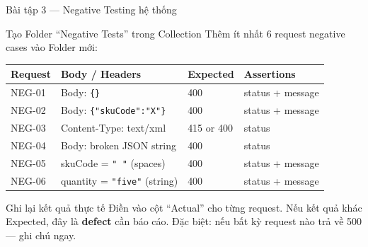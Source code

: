 \documentclass[aspectratio=169,10pt]{beamer}
\begin{document}
\begin{frame}[fragile]{Bài tập 3 --- Negative Testing hệ thống}
  \begin{block}{Tạo Folder ``Negative Tests'' trong Collection}
    Thêm ít nhất 6 request negative cases vào Folder mới:
  \end{block}

  \begin{center}
  \small
  \begin{tabular}{p{1.5cm}p{4cm}p{3cm}p{2cm}}
    \toprule
    \textbf{Request} & \textbf{Body / Headers} & \textbf{Expected} & \textbf{Assertions} \\
    \midrule
    NEG-01 & Body: \texttt{\{\}} & 400 & status + message \\
    NEG-02 & Body: \texttt{\{"skuCode":"X"\}} & 400 & status + message \\
    NEG-03 & Content-Type: text/xml & 415 or 400 & status \\
    NEG-04 & Body: broken JSON string & 400 & status \\
    NEG-05 & skuCode = \texttt{"   "} (spaces) & 400 & status + message \\
    NEG-06 & quantity = \texttt{"five"} (string) & 400 & status + message \\
    \bottomrule
  \end{tabular}
  \end{center}

  \vspace{0.3em}
  \begin{alertblock}{Ghi lại kết quả thực tế}
    Điền vào cột ``Actual'' cho từng request.
    Nếu kết quả khác Expected, đây là \textbf{defect} cần báo cáo.
    Đặc biệt: nếu bất kỳ request nào trả về 500 --- ghi chú ngay.
  \end{alertblock}
\end{frame}
\end{document}
